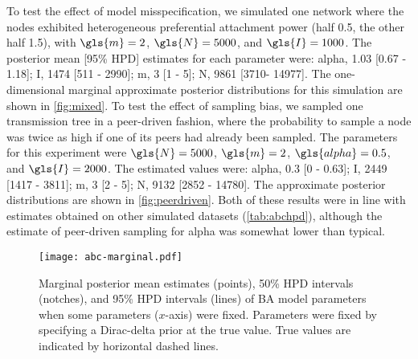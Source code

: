 To test the effect of model misspecification, we simulated one network where
the nodes exhibited heterogeneous preferential attachment power (half 0.5, the
other half 1.5), with $\gls{m} = 2$, $\gls{N} = 5000$, and $\gls{I} = 1000$.
The posterior mean [95\% \gls{HPD}] estimates for each parameter were: 
\gls{alpha},
  1.03 
  [0.67 -
   1.18];
\gls{I},
  1474 
  [511 -
   2990];
\gls{m},
  3 
  [1 -
   5];
\gls{N},
  9861 
  [3710-
   14977].
The one-dimensional marginal approximate posterior distributions for this
simulation are shown in \cref{fig:mixed}. To test the effect of sampling bias,
we sampled one transmission tree in a peer-driven fashion, where the
probability to sample a node was twice as high if one of its peers had already
been sampled. The parameters for this experiment were $\gls{N} = 5000$,
$\gls{m} = 2$, $\gls{alpha} = 0.5$, and $\gls{I} = 2000$. The estimated values
were: \gls{alpha},
  0.3 
  [0 -
   0.63];
\gls{I},
  2449 
  [1417 -
   3811];
\gls{m},
  3 
  [2 -
   5];
\gls{N},
  9132 
  [2852 -
   14780].
The approximate posterior distributions are shown in \cref{fig:peerdriven}.
Both of these results were in line with estimates obtained on other simulated
datasets (\cref{tab:abchpd}), although the estimate of peer-driven sampling for
\gls{alpha} was somewhat lower than typical.


\begin{figure}[ht]
    \centering
    \texttt{[image: abc-marginal.pdf]}
    \caption[
        Marginal posterior mean estimates and 50\%/95\% \gls{HPD} intervals of
        \gls{BA} model parameters when some parameters were fixed.
    ]{
        Marginal posterior mean estimates (points), 50\% \gls{HPD} intervals
        (notches), and 95\% \gls{HPD} intervals (lines) of \gls{BA} model
        parameters when some parameters ($x$-axis) were fixed. Parameters were
        fixed by specifying a Dirac-delta prior at the true value. True values
        are indicated by horizontal dashed lines.
    }
    \label{fig:marginal}
\end{figure}

